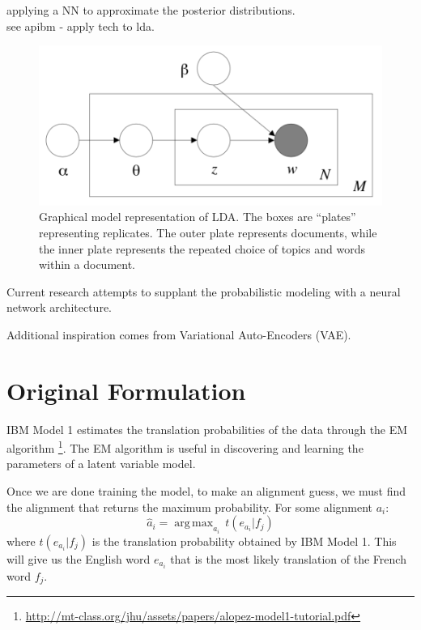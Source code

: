 \documentclass[twoside,twocolumn]{article}
\DeclareMathOperator*{\argmax}{arg\,max}
\begin{document}
applying a NN to approximate the posterior distributions.\\
see apibm - apply tech to lda.\\
\cite{blei2003lda}
\cite{kingma2013auto}

\begin{figure}
\centering
\includegraphics[scale=0.5]{LDADiagram}
\caption{Graphical model representation of LDA. The boxes are “plates” representing replicates. The outer plate represents documents, while the inner plate represents the repeated choice of topics and words within a document. }
\end{figure}

Current research attempts to supplant the probabilistic modeling with a neural network architecture. 

Additional inspiration comes from Variational Auto-Encoders (VAE).

\section{Original Formulation}

IBM Model 1 estimates the translation probabilities of the data through the EM algorithm \footnote{\url{http://mt-class.org/jhu/assets/papers/alopez-model1-tutorial.pdf}}. The EM algorithm is useful in discovering and learning the parameters of a latent variable model. 

Once we are done training the model, to make an alignment guess, we must find the alignment that returns the maximum probability. For some alignment $a_i$:
\begin{equation}
\hat{a}_i = \argmax_{a_i} \, t(e_{a_i}|f_j)
\end{equation}
where $t(e_{a_i}|f_j)$ is the translation probability obtained by IBM Model 1. This will give us the English word $e_{a_i}$ that is the most likely translation of the French word $f_j$.
\end{document}
